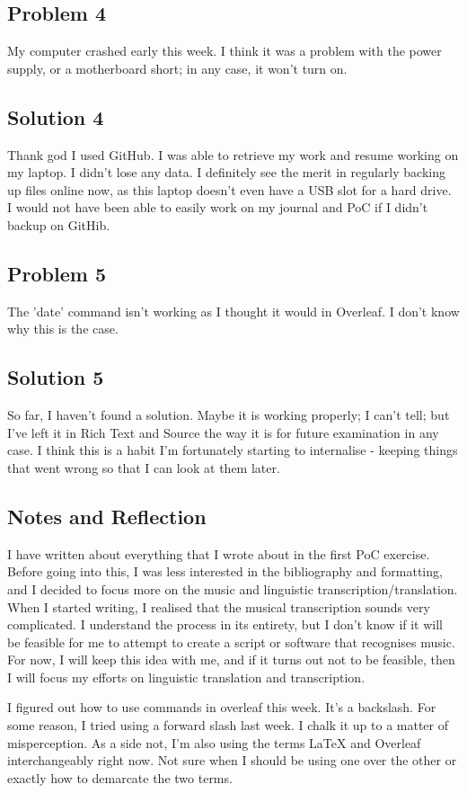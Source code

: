\documentclass{article}
\begin{document}
\subsection{Problem 4}
My computer crashed early this week. I think it was a problem with the power supply, or a motherboard short; in any case, it won't turn on.
\subsection{Solution 4}
Thank god I used GitHub. I was able to retrieve my work and resume working on my laptop. I didn't lose any data. I definitely see the merit in regularly backing up files online now, as this laptop doesn't even have a USB slot for a hard drive. I would not have been able to easily work on my journal and PoC if I didn't backup on GitHib.
\subsection{Problem 5}
The 'date' command isn't working as I thought it would in Overleaf. I don't know why this is the case.
\subsection{Solution 5}
So far, I haven't found a solution. Maybe it is working properly; I can't tell; but I've left it in Rich Text and Source the way it is for future examination in any case. I think this is a habit I'm fortunately starting to internalise - keeping things that went wrong so that I can look at them later.
\subsection{Notes and Reflection}
I have written about everything that I wrote about in the first PoC exercise. Before going into this, I was less interested in the bibliography and formatting, and I decided to focus more on the music and linguistic transcription/translation. When I started writing, I realised that the musical transcription sounds very complicated. I understand the process in its entirety, but I don’t know if it will be feasible for me to attempt to create a script or software that recognises music. For now, I will keep this idea with me, and if it turns out not to be feasible, then I will focus my efforts on linguistic translation and transcription.

I figured out how to use commands in overleaf this week. It's a backslash. For some reason, I tried using a forward slash last week. I chalk it up to a matter of misperception. As a side not, I'm also using the terms LaTeX and Overleaf interchangeably right now. Not sure when I should be using one over the other or exactly how to demarcate the two terms.
\end{document}
